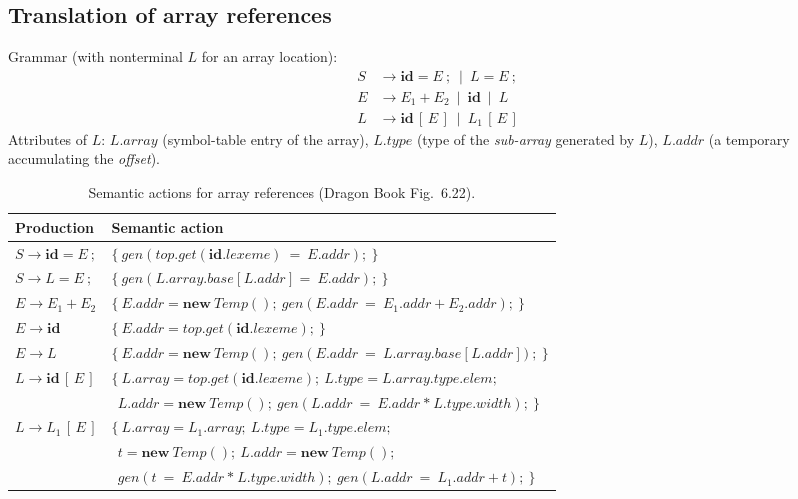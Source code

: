 \documentclass[11pt,a4paper]{article}
\newcommand{\at}[2]{\ensuremath{#1.\mathit{#2}}}
\newcommand{\tok}[1]{\ensuremath{\mathtt{#1}}}
\begin{document}
\subsection{Translation of array references}
Grammar (with nonterminal $L$ for an array location):
\begin{align*}
S &\to \mathbf{id} = E\ ;\ \mid\ L = E\ ;\\
E &\to E_1 + E_2\ \mid\ \mathbf{id}\ \mid\ L\\
L &\to \mathbf{id}\,[\,E\,]\ \mid\ L_1\,[\,E\,]
\end{align*}
Attributes of $L$: \at{L}{array} (symbol-table entry of the array), \at{L}{type} (type of the \emph{sub-array} generated by $L$), \at{L}{addr} (a temporary accumulating the \emph{offset}).

\begin{table}[htbp]
\centering
\small
\begin{tabular}{@{}L{2.4cm} L{12.2cm}@{}}
\toprule
\textbf{Production} & \textbf{Semantic action} \\ \midrule
$S \to \mathbf{id}=E\ ;$ & $\{\ \mathit{gen}(\mathit{top}.\mathit{get}(\at{\mathbf{id}}{lexeme})\ \tok{=}\ \at{E}{addr});\ \}$ \\[2pt]
$S \to L=E\ ;$ & $\{\ \mathit{gen}(\at{L}{array}.\mathit{base}\ \tok{[}\ \at{L}{addr}\ \tok{]}\ \tok{=}\ \at{E}{addr});\ \}$ \\[2pt]
$E \to E_1+E_2$ & $\{\ \at{E}{addr}=\mathbf{new}\ \mathit{Temp}();\ \mathit{gen}(\at{E}{addr}\ \tok{=}\ \at{E_1}{addr}\ \tok{+}\ \at{E_2}{addr});\ \}$ \\[2pt]
$E \to \mathbf{id}$ & $\{\ \at{E}{addr}=\mathit{top}.\mathit{get}(\at{\mathbf{id}}{lexeme});\ \}$ \\[2pt]
$E \to L$ & $\{\ \at{E}{addr}=\mathbf{new}\ \mathit{Temp}();\ \mathit{gen}(\at{E}{addr}\ \tok{=}\ \at{L}{array}.\mathit{base}\ \tok{[}\ \at{L}{addr}\ \tok{]});\ \}$ \\[2pt]
$L \to \mathbf{id}\,[\,E\,]$ & $\{\ \at{L}{array}=\mathit{top}.\mathit{get}(\at{\mathbf{id}}{lexeme});\ \at{L}{type}=\at{L}{array}.\mathit{type}.\mathit{elem};$\\
 & $\ \ \at{L}{addr}=\mathbf{new}\ \mathit{Temp}();\ \mathit{gen}(\at{L}{addr}\ \tok{=}\ \at{E}{addr}\ \tok{*}\ \at{L}{type}.\mathit{width});\ \}$ \\[2pt]
$L \to L_1\,[\,E\,]$ & $\{\ \at{L}{array}=\at{L_1}{array};\ \at{L}{type}=\at{L_1}{type}.\mathit{elem};$\\
 & $\ \ t=\mathbf{new}\ \mathit{Temp}();\ \at{L}{addr}=\mathbf{new}\ \mathit{Temp}();$\\
 & $\ \ \mathit{gen}(t\ \tok{=}\ \at{E}{addr}\ \tok{*}\ \at{L}{type}.\mathit{width});\ \mathit{gen}(\at{L}{addr}\ \tok{=}\ \at{L_1}{addr}\ \tok{+}\ t);\ \}$ \\ \bottomrule
\end{tabular}
\caption{Semantic actions for array references (Dragon Book Fig.~6.22).}
\end{table}
\end{document}
